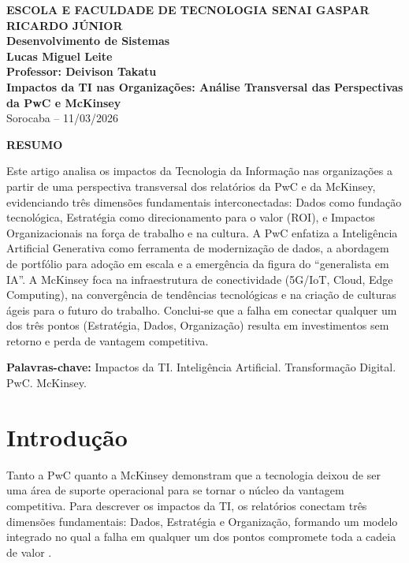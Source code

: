\documentclass[12pt,a4paper,oneside]{article}
\begin{document}
\begin{center}
  \textbf{\large ESCOLA E FACULDADE DE TECNOLOGIA SENAI GASPAR RICARDO JÚNIOR}\\
  \textbf{Desenvolvimento de Sistemas}\\[1cm]
  \textbf{\Large Lucas Miguel Leite}\\[0.5cm]
  \textbf{Professor: Deivison Takatu}\\[2cm]
  \textbf{\LARGE\textbf{Impactos da TI nas Organizações: Análise Transversal das Perspectivas da PwC e McKinsey}}\\[1cm]
  Sorocaba -- 11/03/2026
\end{center}

\vspace{1cm}

\begin{center}
  \textbf{RESUMO}
\end{center}

Este artigo analisa os impactos da Tecnologia da Informação nas organizações a partir de uma perspectiva transversal dos relatórios da PwC e da McKinsey, evidenciando três dimensões fundamentais interconectadas: Dados como fundação tecnológica, Estratégia como direcionamento para o valor (ROI), e Impactos Organizacionais na força de trabalho e na cultura. A PwC enfatiza a Inteligência Artificial Generativa como ferramenta de modernização de dados, a abordagem de portfólio para adoção em escala e a emergência da figura do ``generalista em IA''. A McKinsey foca na infraestrutura de conectividade (5G/IoT, Cloud, Edge Computing), na convergência de tendências tecnológicas e na criação de culturas ágeis para o futuro do trabalho. Conclui-se que a falha em conectar qualquer um dos três pontos (Estratégia, Dados, Organização) resulta em investimentos sem retorno e perda de vantagem competitiva.

\vspace{0.5cm}
\textbf{Palavras-chave:} Impactos da TI. Inteligência Artificial. Transformação Digital. PwC. McKinsey.

\newpage

\section{Introdução}

Tanto a PwC quanto a McKinsey demonstram que a tecnologia deixou de ser uma área de suporte operacional para se tornar o núcleo da vantagem competitiva. Para descrever os impactos da TI, os relatórios conectam três dimensões fundamentais: Dados, Estratégia e Organização, formando um modelo integrado no qual a falha em qualquer um dos pontos compromete toda a cadeia de valor \cite{tarapanoff2015}.
\end{document}
